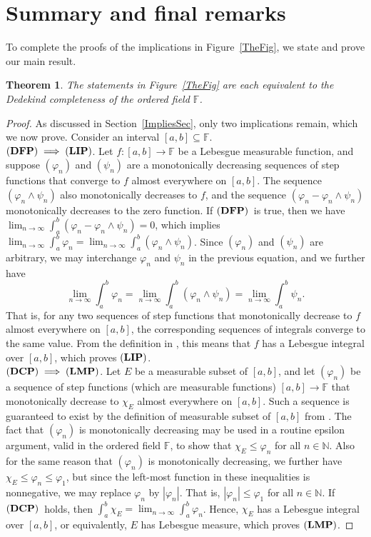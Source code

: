 \documentclass[11pt,a4paper]{article}
\newtheorem{theorem}{Theorem}[section]
\def\DCP{\ensuremath{{\bf(DCP_{A})}}}
\def\F{\mathbb{F}}
\def\N{\mathbb{N}}
\def\DCP{\ensuremath{{\bf(DCP)}}}
\def\DFP{\ensuremath{{\bf(DFP)}}}
\def\LIP{\ensuremath{{\bf(LIP)}}}
\def\LMP{\ensuremath{{\bf(LMP)}}}
\def\lbrak{\left[}
\def\rbrak{\right]}
\def\abClosed{\lbrak a,b\rbrak}
\def\into{\longrightarrow}
\def\sub{\subseteq}
\def\nseqlim{{\displaystyle\lim_{n\rightarrow\infty}}}
\begin{document}
\section{Summary and final remarks}

To complete the proofs of the implications in Figure~\ref{TheFig}, we state and prove our main result.

\begin{theorem} The statements in Figure~\ref{TheFig} are each equivalent to the Dedekind completeness of the ordered field $\F$.
\end{theorem}
\begin{proof} As discussed in Section~\ref{ImpliesSec}, only two implications remain, which we now prove. Consider an interval $\abClosed\sub\F$.\\

\noindent$\DFP\implies\LIP$. Let $f:\abClosed\into\F$ be a Lebesgue measurable function, and suppose $(\varphi_n)$ and $(\psi_n)$ are a monotonically decreasing sequences of step functions that converge to $f$ almost everywhere on $\abClosed$. The sequence $(\varphi_n\wedge\psi_n)$ also monotonically decreases to $f$, and the sequence $(\varphi_n-\varphi_n\wedge\psi_n)$ monotonically decreases to the zero function. If \DFP\ is true, then we have $\nseqlim\int_a^b(\varphi_n-\varphi_n\wedge\psi_n)=0$, which implies $\nseqlim\int_a^b\varphi_n=\nseqlim\int_a^b(\varphi_n\wedge\psi_n)$. Since $(\varphi_n)$ and $(\psi_n)$ are arbitrary, we may interchange $\varphi_n$ and $\psi_n$ in the previous equation, and we further have
\[\nseqlim\int_a^b\varphi_n=\nseqlim\int_a^b(\varphi_n\wedge\psi_n)=\nseqlim\int_a^b\psi_n.\]
That is, for any two sequences of step functions that monotonically decrease to $f$ almost everywhere on $\abClosed$, the corresponding sequences of integrals converge to the same value. From the definition in \cite[pp.~114--115]{can24}, this means that $f$ has a Lebesgue integral over $\abClosed$, which proves \LIP.\\ 


\noindent$\DCP\implies\LMP$. Let $E$ be a measurable subset of $\abClosed$, and let $(\varphi_n)$ be a sequence of step functions (which are measurable functions) $\abClosed\into\F$ that monotonically decrease to $\chi_E$ almost everywhere on $\abClosed$. Such a sequence is guaranteed to exist by the definition of measurable subset of $\abClosed$ from \cite[pp.~114--115]{can24}. The fact that $(\varphi_n)$ is monotonically decreasing may be used in a routine epsilon argument, valid in the ordered field $\F$, to show that $\chi_E\leq\varphi_n$ for all $n\in\N$. Also for the same reason that $(\varphi_n)$ is monotonically decreasing, we further have $\chi_E\leq \varphi_n\leq \varphi_1$, but since the left-most function in these inequalities is nonnegative, we may replace $\varphi_n$ by $|\varphi_n|$. That is, $|\varphi_n|\leq \varphi_1$ for all $n\in\N$. If \DCP\  holds, then $\int_a^b\chi_E=\nseqlim\int_a^b\varphi_n$. Hence, $\chi_E$ has a Lebesgue integral over $\abClosed$, or equivalently, $E$ has Lebesgue measure, which proves \LMP.
\end{proof}
\end{document}
